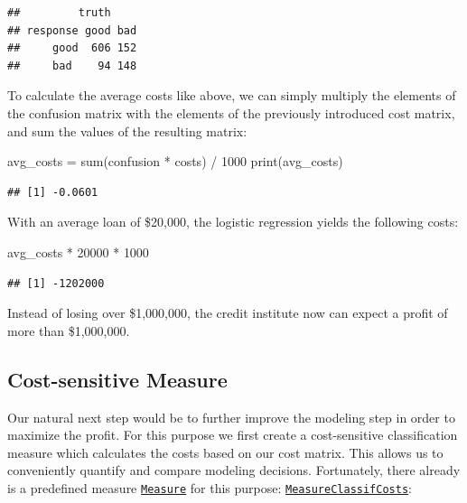 \documentclass[
]{scrbook}
\newenvironment{Shaded}{\begin{snugshade}}{\end{snugshade}}
\newcommand{\DecValTok}[1]{\textcolor[rgb]{0.00,0.00,0.81}{#1}}
\newcommand{\FunctionTok}[1]{\textcolor[rgb]{0.00,0.00,0.00}{#1}}
\newcommand{\NormalTok}[1]{#1}
\newcommand{\OtherTok}[1]{\textcolor[rgb]{0.56,0.35,0.01}{#1}}
\newcommand{\SpecialCharTok}[1]{\textcolor[rgb]{0.00,0.00,0.00}{#1}}
\renewenvironment{Shaded} {\begin{snugshade}\small} {\end{snugshade}}
\begin{document}
\begin{verbatim}
##         truth
## response good bad
##     good  606 152
##     bad    94 148
\end{verbatim}

To calculate the average costs like above, we can simply multiply the elements of the confusion matrix with the elements of the previously introduced cost matrix, and sum the values of the resulting matrix:

\begin{Shaded}
\begin{Highlighting}[]
\NormalTok{avg\_costs }\OtherTok{=} \FunctionTok{sum}\NormalTok{(confusion }\SpecialCharTok{*}\NormalTok{ costs) }\SpecialCharTok{/} \DecValTok{1000}
\FunctionTok{print}\NormalTok{(avg\_costs)}
\end{Highlighting}
\end{Shaded}

\begin{verbatim}
## [1] -0.0601
\end{verbatim}

With an average loan of \$20,000, the logistic regression yields the following costs:

\begin{Shaded}
\begin{Highlighting}[]
\NormalTok{avg\_costs }\SpecialCharTok{*} \DecValTok{20000} \SpecialCharTok{*} \DecValTok{1000}
\end{Highlighting}
\end{Shaded}

\begin{verbatim}
## [1] -1202000
\end{verbatim}

Instead of losing over \$1,000,000, the credit institute now can expect a profit of more than \$1,000,000.

\hypertarget{cost-sensitive-measure}{%
\subsection{Cost-sensitive Measure}\label{cost-sensitive-measure}}

Our natural next step would be to further improve the modeling step in order to maximize the profit.
For this purpose we first create a cost-sensitive classification measure which calculates the costs based on our cost matrix.
This allows us to conveniently quantify and compare modeling decisions.
Fortunately, there already is a predefined measure \href{https://mlr3.mlr-org.com/reference/Measure.html}{\texttt{Measure}} for this purpose: \href{https://mlr3.mlr-org.com/reference/mlr_measures_classif.costs.html}{\texttt{MeasureClassifCosts}}:
\end{document}
